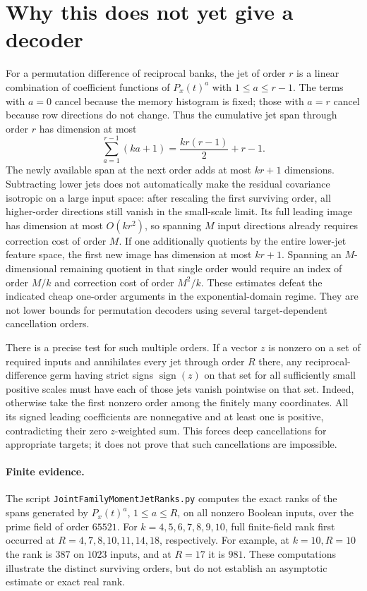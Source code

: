 \documentclass{article}
\begin{document}
\section{Why this does not yet give a decoder}
For a permutation difference of reciprocal banks, the jet of order
$r$ is a linear combination of coefficient functions of $P_x(t)^a$
with $1\leq a\leq r-1$. The terms with $a=0$ cancel because the
memory histogram is fixed; those with $a=r$ cancel because row
directions do not change. Thus the cumulative jet span through order
$r$ has dimension at most
\[
 \sum_{a=1}^{r-1}(ka+1)=\frac{kr(r-1)}2+r-1.
 \tag{3}
\]
The newly available span at the next order adds at most $kr+1$
dimensions. Subtracting lower jets does not automatically make the
residual covariance isotropic on a large input space: after rescaling
the first surviving order, all higher-order directions still vanish
in the small-scale limit. Its full leading image has dimension at most
$O(kr^2)$, so spanning $M$ input directions already requires correction
cost of order $M$. If one additionally quotients by the entire lower-jet
feature space, the first new image has dimension at most $kr+1$.
Spanning an $M$-dimensional remaining quotient in that single order
would require an index of order $M/k$ and correction cost of order
$M^2/k$. These estimates defeat the indicated cheap one-order arguments
in the exponential-domain regime. They are not lower bounds for
permutation decoders using several target-dependent cancellation orders.

There is a precise test for such multiple orders. If a vector $z$ is
nonzero on a set of required inputs and annihilates every jet through
order $R$ there, any reciprocal-difference germ having strict signs
$\operatorname{sign}(z)$ on that set for all sufficiently small positive
scales must have each of those jets vanish pointwise on that set.
Indeed, otherwise take the first nonzero order among the finitely many
coordinates. All its signed leading coefficients are nonnegative and
at least one is positive, contradicting their zero $z$-weighted sum.
This forces deep cancellations for appropriate targets; it does not
prove that such cancellations are impossible.

\paragraph{Finite evidence.}
The script \texttt{JointFamilyMomentJetRanks.py} computes the exact
ranks of the spans generated by $P_x(t)^a$, $1\leq a\leq R$, on
all nonzero Boolean inputs, over the prime field of order $65521$.
For $k=4,5,6,7,8,9,10$, full finite-field rank first occurred at
$R=4,7,8,10,11,14,18$, respectively. For example, at $k=10,R=10$
the rank is $387$ on $1023$ inputs, and at $R=17$ it is $981$.
These computations illustrate the distinct surviving orders, but
do not establish an asymptotic estimate or exact real rank.
\end{document}
